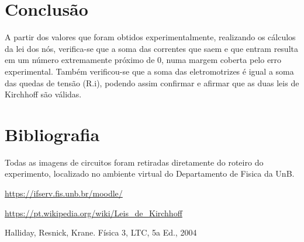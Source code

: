 \documentclass[article]{abntex2}
\begin{document}
\section{Conclusão}

A partir dos valores que foram obtidos experimentalmente,
 realizando os cálculos da lei dos nós, verifica-se que a soma 
 das correntes que saem e que entram resulta em um número
  extremamente próximo de 0, numa margem coberta pelo
   erro experimental. Também verificou-se que a soma
    das eletromotrizes é igual a soma das quedas de
     tensão (R.i), podendo assim confirmar e afirmar
      que as duas leis de Kirchhoff são válidas.

\section{Bibliografia}
Todas as imagens de circuitos foram retiradas diretamente
do roteiro do experimento, localizado 
no ambiente virtual do Departamento de Fisica da UnB.
\newline

\url{https://ifserv.fis.unb.br/moodle/}

\url{https://pt.wikipedia.org/wiki/Leis_de_Kirchhoff}

Halliday, Resnick, Krane. Física 3, LTC, 5a Ed., 2004
\end{document}
